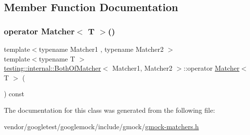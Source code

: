 \subsection{Member Function Documentation}
\mbox{\label{classtesting_1_1internal_1_1_both_of_matcher_a5846390364b763fbe31fb11f8c2e3180}} 
\subsubsection{\texorpdfstring{operator Matcher$<$ T $>$()}{operator Matcher< T >()}}
{\footnotesize\ttfamily template$<$typename Matcher1 , typename Matcher2 $>$ \\
template$<$typename T $>$ \\
\hyperlink{classtesting_1_1internal_1_1_both_of_matcher}{testing\+::internal\+::\+Both\+Of\+Matcher}$<$ Matcher1, Matcher2 $>$\+::operator \hyperlink{classtesting_1_1_matcher}{Matcher}$<$ T $>$ (\begin{DoxyParamCaption}{ }\end{DoxyParamCaption}) const\hspace{0.3cm}{\ttfamily [inline]}}



The documentation for this class was generated from the following file\+:\begin{DoxyCompactItemize}
\item 
vendor/googletest/googlemock/include/gmock/\hyperlink{gmock-matchers_8h}{gmock-\/matchers.\+h}\end{DoxyCompactItemize}
